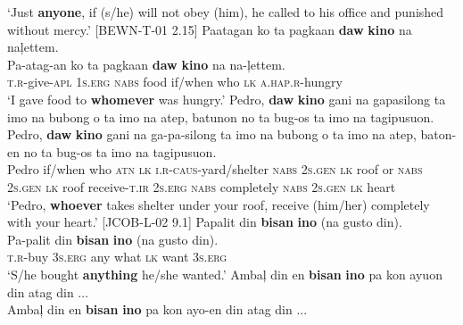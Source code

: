 \glt `Just \textbf{anyone}, if (s/he) will not obey (him), he called to his office and punished without mercy.’ [BEWN-T-01 2.15]
\z
\ea
Paatagan  ko  ta  pagkaan  \textbf{daw}  \textbf{kino}  na  naļettem. \\\smallskip
 \gll Pa-atag-an  ko  ta  pagkaan  \textbf{daw}  \textbf{kino}  na  na-ļettem. \\
\textsc{t.r}-give\textsc{-apl}  1\textsc{s.erg}  \textsc{nabs}  food  if/when  who  \textsc{lk}  \textsc{a.hap.r}-hungry \\
\glt ‘I gave food to \textbf{whomever} was hungry.’
\z
\ea
Pedro,  \textbf{daw}  \textbf{kino}  gani  na  gapasilong  ta imo  na  bubong  o  ta  imo  na  atep,  batunon  no ta  bug-os  ta  imo  na  tagipusuon. \\\smallskip
 \gll Pedro,  \textbf{daw}  \textbf{kino}  gani  na  ga-pa-silong  ta imo  na  bubong  o  ta  imo  na  atep,  baton-en  no ta  bug-os  ta  imo  na  tagipusuon. \\
Pedro  if/when  who  \textsc{atn}  \textsc{lk}  \textsc{i.r-caus}-yard/shelter  \textsc{nabs} 2\textsc{s.gen}  \textsc{lk}  roof\footnotemark{}  or  \textsc{nabs}  2\textsc{s.gen}  \textsc{lk}  roof  receive\textsc{-t.ir}  2\textsc{s.erg} \textsc{nabs}  completely  \textsc{nabs}  2\textsc{s.gen}  \textsc{lk}  heart \\
\glt `Pedro, \textbf{whoever} takes shelter under your roof, receive (him/her) completely with your heart.’ [JCOB-L-02 9.1]
\z
\ea
Papalit  din  \textbf{bisan}  \textbf{ino}  (na  gusto  din). \\\smallskip
 \gll Pa-palit  din  \textbf{bisan}  \textbf{ino}  (na  gusto  din). \\
\textsc{t.r}-buy  3\textsc{s.erg}  any  what  \textsc{lk}  want  3\textsc{s.erg} \\
\glt ‘S/he bought \textbf{anything} he/she wanted.’
\z
\ea
Ambaļ  din  en  \textbf{bisan}  \textbf{ino}  pa  kon  ayuon  din  atag  din ... \\\smallskip
 \gll Ambaļ  din  en  \textbf{bisan}  \textbf{ino}  pa  kon  ayo-en  din  atag  din ... \\

